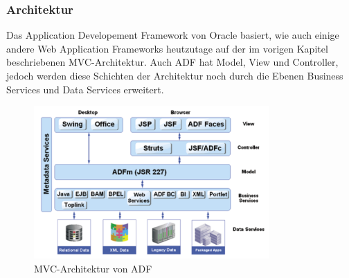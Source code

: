 \subsubsection{Architektur}
Das Application Developement Framework von Oracle basiert, wie auch einige andere Web Application Frameworks heutzutage auf der im vorigen Kapitel beschriebenen MVC-Architektur. 
Auch ADF hat Model, View und Controller, jedoch werden diese Schichten der Architektur noch durch die Ebenen Business Services und Data Services erweitert.
\begin{figure}[H]
\centering
\includegraphics[width=0.80\textwidth]{img/MVC-ADF3.png}
\caption {MVC-Architektur von ADF}
\end{figure}

